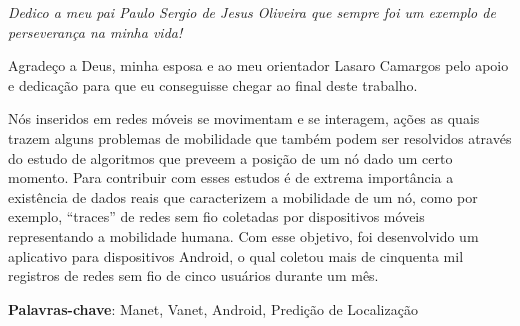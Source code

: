 \documentclass[12pt, %
openright, 
oneside,
a4paper,
brazil]{facom-ufu-abntex2}
\begin{document}
\begin{dedicatoria}
   \vspace*{\fill}
   \centering
   \noindent
   \textit{Dedico a meu pai Paulo Sergio de Jesus Oliveira que sempre foi um exemplo de perseverança na minha vida!}  %
   \vspace*{\fill}
\end{dedicatoria}

\begin{agradecimentos}
Agradeço a Deus, minha esposa e ao meu orientador Lasaro Camargos pelo apoio e dedicação para que eu conseguisse chegar ao final deste trabalho. %
\end{agradecimentos}




\begin{resumo} %

Nós inseridos em redes móveis se movimentam e se interagem, ações as quais trazem alguns problemas de mobilidade que também podem ser resolvidos através do estudo de algoritmos que preveem a posição de um nó dado um certo momento. Para contribuir com esses estudos é de extrema importância a existência de dados reais que caracterizem a mobilidade de um nó, como por exemplo, ``traces'' de redes sem fio coletadas por dispositivos móveis representando a mobilidade humana. Com esse objetivo, foi desenvolvido um aplicativo para dispositivos Android, o qual coletou mais de cinquenta mil registros de redes sem fio de cinco usuários durante um mês.   

 \vspace{\onelineskip}
    
 \noindent
 \textbf{Palavras-chave}: Manet, Vanet, Android, Predição de Localização%
\end{resumo}

\listoffigures*
\cleardoublepage

\listoftables*
\cleardoublepage
\end{document}
